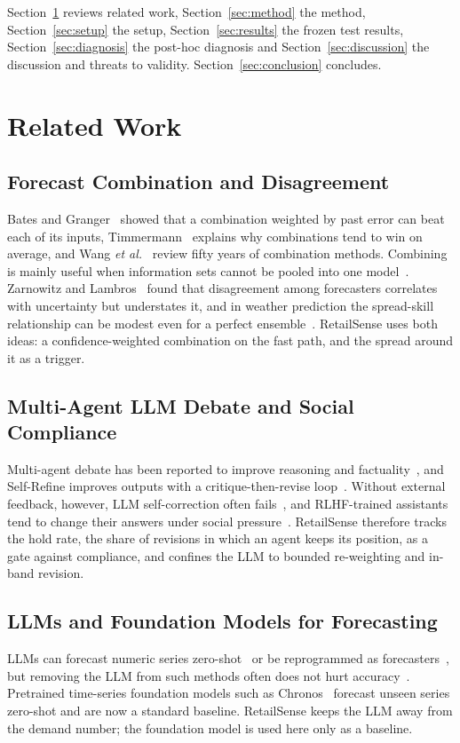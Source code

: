 \documentclass[conference]{IEEEtran}
\begin{document}
Section~\ref{sec:related} reviews related work, Section~\ref{sec:method} the method,
Section~\ref{sec:setup} the setup, Section~\ref{sec:results} the frozen test results,
Section~\ref{sec:diagnosis} the post-hoc diagnosis and Section~\ref{sec:discussion} the discussion
and threats to validity. Section~\ref{sec:conclusion} concludes.

\section{Related Work}\label{sec:related}

\subsection{Forecast Combination and Disagreement}
Bates and Granger~\cite{bates1969} showed that a combination weighted by past error can beat each
of its inputs, Timmermann~\cite{timmermann2006} explains why combinations tend to win on average,
and Wang \emph{et al.}~\cite{wang2023} review fifty years of combination methods. Combining is
mainly useful when information sets cannot be pooled into one model~\cite{timmermann2006}.
Zarnowitz and Lambros~\cite{zarnowitz1987} found that disagreement among forecasters correlates
with uncertainty but understates it, and in weather prediction the spread-skill relationship can be
modest even for a perfect ensemble~\cite{whitaker1998}. RetailSense uses both ideas: a
confidence-weighted combination on the fast path, and the spread around it as a trigger.

\subsection{Multi-Agent LLM Debate and Social Compliance}
Multi-agent debate has been reported to improve reasoning and factuality~\cite{du2024}, and
Self-Refine improves outputs with a critique-then-revise loop~\cite{madaan2023}. Without external
feedback, however, LLM self-correction often fails~\cite{huang2024}, and RLHF-trained assistants
tend to change their answers under social pressure~\cite{sharma2024}. RetailSense therefore tracks
the hold rate, the share of revisions in which an agent keeps its position, as a gate against
compliance, and confines the LLM to bounded re-weighting and in-band revision.

\subsection{LLMs and Foundation Models for Forecasting}
LLMs can forecast numeric series zero-shot~\cite{gruver2023} or be reprogrammed as
forecasters~\cite{jin2024}, but removing the LLM from such methods often does not hurt
accuracy~\cite{tan2024}. Pretrained time-series foundation models such as Chronos~\cite{ansari2024}
forecast unseen series zero-shot and are now a standard baseline. RetailSense keeps the LLM away
from the demand number; the foundation model is used here only as a baseline.
\end{document}
